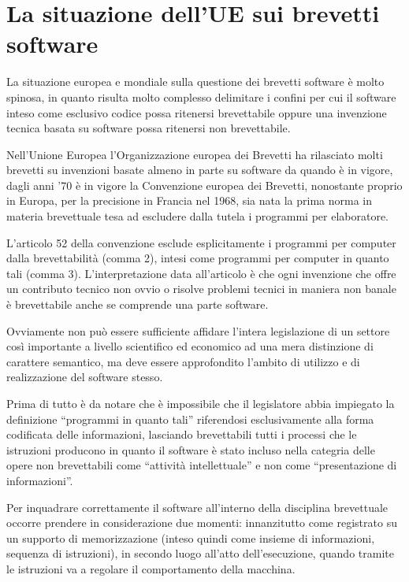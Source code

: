 \section{La situazione dell'UE sui brevetti software}
La situazione europea e mondiale sulla questione dei brevetti software è molto spinosa, in quanto risulta molto complesso delimitare i confini per cui il software inteso come esclusivo codice possa ritenersi brevettabile oppure una invenzione tecnica basata su software possa ritenersi non brevettabile.

Nell'Unione Europea l'Organizzazione europea dei Brevetti ha rilasciato molti brevetti su invenzioni basate almeno in parte su software da quando è in vigore, dagli anni '70 è in vigore la Convenzione europea dei Brevetti, nonostante proprio in Europa, per la precisione in Francia nel 1968, sia nata la prima norma in materia brevettuale tesa ad escludere dalla tutela i programmi per elaboratore.

L'articolo 52  della convenzione esclude esplicitamente i programmi per computer dalla brevettabilità (comma 2), intesi come programmi per computer in quanto tali (comma 3). L'interpretazione data all'articolo è che ogni invenzione che offre un contributo tecnico non ovvio o risolve problemi tecnici in maniera non banale è brevettabile anche se comprende una parte software.

Ovviamente non può essere sufficiente affidare l'intera legislazione di un settore così importante a livello scientifico ed economico ad una mera distinzione di carattere semantico, ma deve essere approfondito l'ambito di utilizzo e di realizzazione del software stesso. 

Prima di tutto è da notare che è impossibile che il legislatore abbia impiegato la definizione ``programmi in quanto tali'' riferendosi esclusivamente alla forma codificata delle informazioni, lasciando brevettabili tutti i processi che le istruzioni producono in quanto il software è stato incluso nella categria delle opere non brevettabili come ``attività intellettuale'' e non come ``presentazione di informazioni''.

Per inquadrare correttamente il software all'interno della disciplina brevettuale occorre prendere in considerazione due momenti: innanzitutto come registrato su un supporto di memorizzazione (inteso quindi come insieme di informazioni, sequenza di istruzioni), in secondo luogo all'atto dell'esecuzione, quando tramite le istruzioni va a regolare il comportamento della macchina. 

